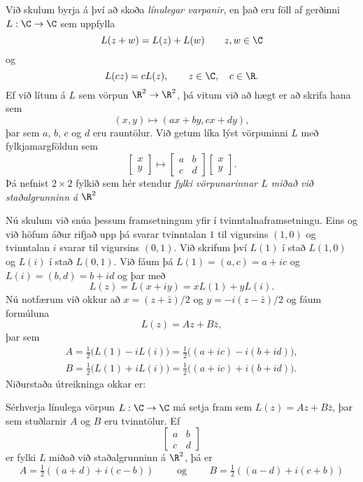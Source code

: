 Við skulum  byrja á því að skoða {\it  línulegar
varpanir}, en það eru
föll af gerðinni $L:\C\to \C$ sem uppfylla
$$
L(z+w)=L(z)+L(w) \qquad z,w\in \C
$$
og
$$
L(cz)=cL(z), \qquad z\in \C, \quad c\in \R.
$$
Ef við lítum á $L$ sem vörpun $\R^2\to \R^2$, þá vitum við að hægt er að
skrifa hana sem
\begin{equation*}
(x,y)\mapsto (ax+by, cx+dy),
\end{equation*}
þar sem $a$, $b$,  $c$ og $d$ eru rauntölur.  Við getum líka lýst
vörpuninni $L$ með fylkjamargföldun sem 
\begin{equation*}
\left[\begin{matrix} x\\ y\end{matrix} \right]\mapsto
\left[\begin{matrix} a & b\\ c & d\end{matrix} \right]
\left[\begin{matrix} x\\ y\end{matrix} \right].
\end{equation*}
Þá nefnist $2\times 2$ fylkið sem hér stendur 
{\it fylki vörpunarinnar $L$ miðað við staðalgrunninn á $\R^2$}

Nú skulum við snúa þessum framsetningum yfir í tvinntalnaframsetningu.
Eins og við höfum áður rifjað upp þá svarar
tvinntalan $1$ til vigursins  $(1,0)$ og tvinntalan $i$ svarar til
vigursins $(0,1)$.  Við skrifum því $L(1)$ í stað $L(1,0)$ og $L(i)$ í
stað $L(0,1)$.  Við fáum þá $L(1)=(a,c)=a+ic$ og
$L(i)=(b,d)=b+id$ og þar með
$$
L(z)=L(x+iy)=xL(1)+yL(i).
$$
Nú notfærum við okkur að $x=(z+\bar z)/2$ og $y=-i(z-\bar
z)/2$ og fáum formúluna
\begin{equation*}
L(z)=Az+B\bar z,
\end{equation*}
þar sem
\begin{align*}
A=\tfrac 12\big(L(1)-iL(i)\big)
=\tfrac 12\big((a+ic)-i(b+id)\big),\\
B=\tfrac 12\big(L(1)+iL(i)\big)
=\tfrac 12\big((a+ic)+i(b+id)\big).
\end{align*}
Niðurstaða útreikninga okkar er:

\begin{se}  Sérhverja línulega vörpun $L:\C\to\C$
má setja fram sem $L(z)=Az+B\bar z$, þar sem stuðlarnir
$A$ og $B$ eru tvinntölur.  Ef 
$$
\left[\begin{matrix} a & b\\ c & d\end{matrix} \right]
$$
er fylki $L$ miðað við staðalgrunninn á $\R^2$, þá er
$$
A=\tfrac 12((a+d)+i(c-b)) \qquad \text{ og } \qquad
B= \tfrac 12((a-d)+i(c+b))
$$
\end{se}


